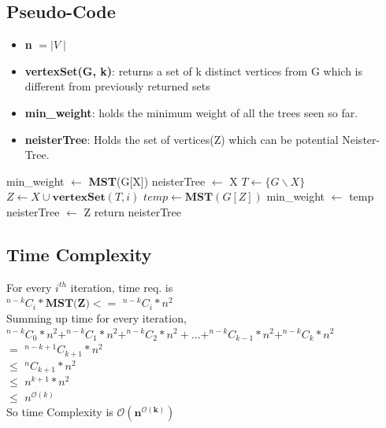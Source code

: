 \documentclass{article}
\begin{document}
\subsection{Pseudo-Code}
\begin{itemize} \itemsep -3pt
        \item \textbf{n} $= \mid V\mid$ 
        \item \textbf{vertexSet(G, k)}: returns a set of k distinct vertices from G which is different from previously returned sets
        \item \textbf{min\_weight}: holds the minimum weight of all the trees seen so far.
        \item \textbf{neisterTree}: Holds the set of vertices(Z) which can be potential Neister-Tree.    
\end{itemize}
\begin{algorithm}
\begin{algorithmic}[1]
\State min\_weight $\gets$ \textbf{MST}(G[X])
\State neisterTree $\gets$ X
\State $T \gets \{G\backslash X\}$
\State $Z \gets X\cup \textbf{vertexSet}(T,i)$ 
\State $temp \gets \textbf{MST}(G[Z])$
\State min\_weight $\gets$ temp
\State neisterTree $\gets$ Z
\EndIf
\EndFor
\EndFor
\State return neisterTree
\EndProcedure
\end{algorithmic}
\end{algorithm}

\subsection{Time Complexity}
For every $i^{th}$ iteration, time req. is \\
\hspace*{1cm}$^{n-k} C_i *\textbf{MST(Z)}  <=$  $^{n-k} C_i * n^2$\\
Summing up time for every iteration,\\
\hspace*{1.2cm} $^{n-k} C_0 * n^2 + ^{n-k} C_1 * n^2 + ^{n-k} C_2 * n^2 + ... +  ^{n-k} C_{k-1} * n^2 + ^{n-k} C_k * n^2$\\
\hspace*{1cm} $=$ $ ^{n-k+1} C_{k+1} * n^2 $\\
\hspace*{1cm} $\leq$ $^{n} C_{k+1} * n^2 $\\
\hspace*{1cm} $\leq$ $n^{k+1}  * n^2 $\\
\hspace*{1cm} $\leq$ $n^{\mathcal{O}(k)}$\\
\hspace*{1cm} So time Complexity is $\boldsymbol{\mathcal{O}(n^{\mathcal{O}(k)})}$\\
\end{document}
